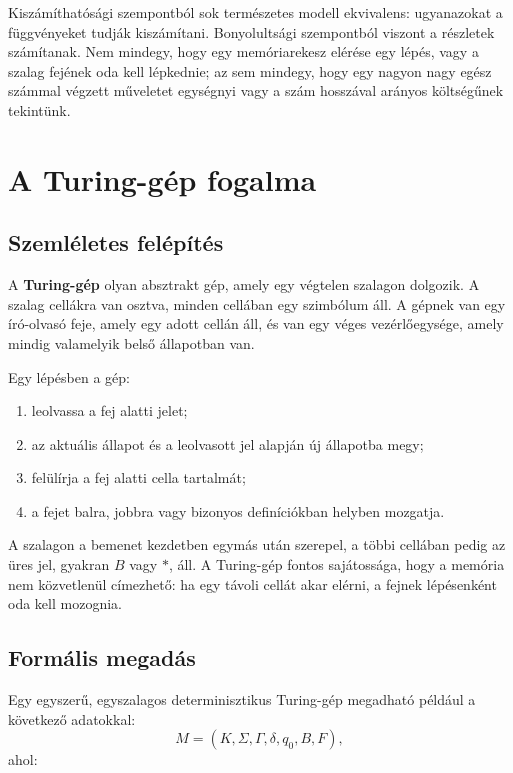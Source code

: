 Kiszámíthatósági szempontból sok természetes modell ekvivalens: ugyanazokat a függvényeket tudják kiszámítani. Bonyolultsági szempontból viszont a részletek számítanak. Nem mindegy, hogy egy memóriarekesz elérése egy lépés, vagy a szalag fejének oda kell lépkednie; az sem mindegy, hogy egy nagyon nagy egész számmal végzett műveletet egységnyi vagy a szám hosszával arányos költségűnek tekintünk.

\section{A Turing-gép fogalma}

\subsection{Szemléletes felépítés}

A \textbf{Turing-gép} olyan absztrakt gép, amely egy végtelen szalagon dolgozik. A szalag cellákra van osztva, minden cellában egy szimbólum áll. A gépnek van egy író-olvasó feje, amely egy adott cellán áll, és van egy véges vezérlőegysége, amely mindig valamelyik belső állapotban van.



Egy lépésben a gép:

\begin{enumerate}
  \item leolvassa a fej alatti jelet;
  \item az aktuális állapot és a leolvasott jel alapján új állapotba megy;
  \item felülírja a fej alatti cella tartalmát;
  \item a fejet balra, jobbra vagy bizonyos definíciókban helyben mozgatja.
\end{enumerate}

A szalagon a bemenet kezdetben egymás után szerepel, a többi cellában pedig az üres jel, gyakran $B$ vagy $\ast$, áll. A Turing-gép fontos sajátossága, hogy a memória nem közvetlenül címezhető: ha egy távoli cellát akar elérni, a fejnek lépésenként oda kell mozognia.

\subsection{Formális megadás}

Egy egyszerű, egyszalagos determinisztikus Turing-gép megadható például a következő adatokkal:
\[
  M=(K,\Sigma,\Gamma,\delta,q_0,B,F),
\]
ahol:

